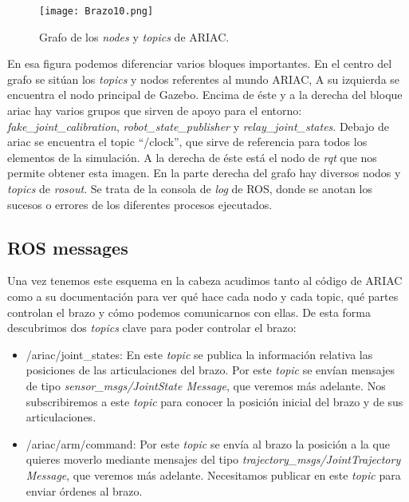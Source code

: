 \begin{figure}[h]
	\centering\texttt{[image: Brazo10.png]}
	\caption{Grafo de los \textit{nodes} y \textit{topics} de ARIAC.}
	\label{fig:ariacgraph2}
\end{figure}

En esa figura podemos diferenciar varios bloques importantes. En el centro del grafo se sitúan los \textit{topics} y nodos referentes al mundo ARIAC, A su izquierda se encuentra el nodo principal de Gazebo. Encima de éste y a la derecha del bloque ariac hay varios grupos que sirven de apoyo para el entorno: \textit{fake\_joint\_calibration}, \textit{robot\_state\_publisher} y \textit{relay\_joint\_states}.
Debajo de ariac se encuentra el topic \textquotedblleft /clock\textquotedblright  , que sirve de referencia para todos los elementos de la simulación. A la derecha de éste está el nodo de \textit{rqt} que nos permite obtener esta imagen. En la parte derecha del grafo hay diversos nodos y \textit{topics} de \textit{rosout}. Se trata de la consola de \textit{log} de ROS, donde se anotan los sucesos o errores de los diferentes procesos ejecutados.

\subsection{ROS messages}
\label{subsec:br_rosmessages}

Una vez tenemos este esquema en la cabeza acudimos tanto al código de ARIAC como a su documentación para ver qué hace cada nodo y cada topic, qué partes controlan el brazo y cómo podemos comunicarnos con ellas. De esta forma descubrimos dos \textit{topics} clave para poder controlar el brazo:
\begin{itemize}
	\item /ariac/joint\_states: En este \textit{topic} se publica la información relativa las posiciones de las articulaciones del brazo. Por este \textit{topic} se envían mensajes de tipo \textit{sensor\_msgs/JointState Message}, que veremos más adelante. Nos subscribiremos a este \textit{topic} para conocer la posición inicial del brazo y de sus articulaciones.
	
	\item /ariac/arm/command: Por este \textit{topic} se envía al brazo la posición a la que quieres moverlo mediante mensajes del tipo \textit{trajectory\_msgs/JointTrajectory Message}, que veremos más adelante. Necesitamos publicar en este \textit{topic} para enviar órdenes al brazo.
	
\end{itemize}

